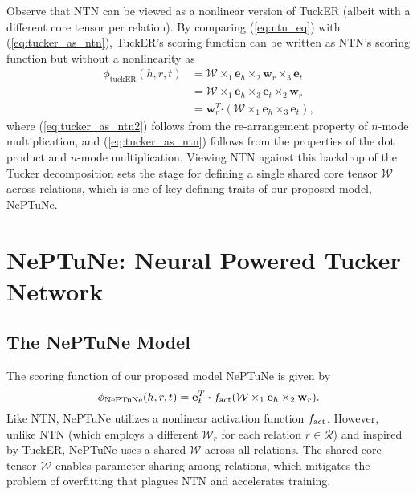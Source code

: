 \documentclass[11pt]{article}
\newcommand{\bigcdot}{\boldsymbol{\cdot}}
\begin{document}
Observe that NTN can be viewed as a nonlinear version of TuckER (albeit with a different core tensor per relation). 
By comparing (\ref{eq:ntn_eq}) with (\ref{eq:tucker_as_ntn}), TuckER's scoring function can be written as NTN's scoring function but without a nonlinearity as
\begin{align}
    \phi_{\text{tuckER}}(h, r, t) &= \mathrm{\mathcal{W}} \times_1 \mathbf{e}_h \times_2 \mathbf{w}_r \times_3 \mathbf{e}_t \label{eq:tucker_as_ntn1}\\
    &= \mathrm{\mathcal{W}} \times_1 \mathbf{e}_h \times_3 \mathbf{e}_t \times_2 \mathbf{w}_r \label{eq:tucker_as_ntn2}\\
    &= \mathbf{w}_r^T \bigcdot (\mathrm{\mathcal{W}} \times_1 \mathbf{e}_h \times_3 \mathbf{e}_t) \label{eq:tucker_as_ntn},
\end{align}
where (\ref{eq:tucker_as_ntn2}) follows from the re-arrangement property of $n$-mode multiplication, and (\ref{eq:tucker_as_ntn}) follows from the properties of the dot product and $n$-mode multiplication. 
Viewing NTN against this backdrop of the Tucker decomposition sets the stage for defining a single shared core tensor $\mathcal{W}$ across relations, which is one of key defining traits of our proposed model, NePTuNe.

\section{NePTuNe: Neural Powered Tucker Network}

\subsection{The NePTuNe Model}

The scoring function of our proposed model NePTuNe is given by
\begin{equation}
    \phi_{\text{NePTuNe}}(h, r, t) = \mathbf{e}_t^T \bigcdot f_{\rm act}(\mathrm{\mathcal{W}} \times_1 \mathbf{e}_h \times_2 \mathbf{w}_r).
    \label{eq:NePTuNe_eq}
\end{equation}
Like NTN, NePTuNe utilizes a nonlinear activation function $f_{\rm act}$.
However, unlike NTN (which employs a different $\mathcal{W}_r$ for each relation $r \in \mathcal{R}$) and inspired by TuckER, NePTuNe uses a shared $\mathcal{W}$ across all relations.  
The shared core tensor $\mathcal{W}$ enables parameter-sharing among relations, which mitigates the problem of overfitting that plagues NTN and accelerates training.
\end{document}
